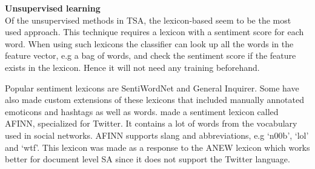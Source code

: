\noindent
\textbf{Unsupervised learning} \\
\noindent Of the unsupervised methods in TSA, the lexicon-based seem to be the most used approach. This technique requires a lexicon with a sentiment score for each word. When using such lexicons the classifier can look up all the words in the feature vector, e.g a bag of words, and check the sentiment score if the feature exists in the lexicon. Hence it will not need any training beforehand.
	
Popular sentiment lexicons are SentiWordNet and General Inquirer. Some have also made custom extensions of these lexicons that included manually annotated emoticons and hashtags as well as words. \cite{article:afinn} made a sentiment lexicon called AFINN, specialized for Twitter. It contains a lot of words from the vocabulary used in social networks. AFINN supports slang and abbreviations, e.g ‘n00b’, ‘lol’ and ‘wtf’. This lexicon was made as a response to the ANEW lexicon which works better for document level SA since it does not support the Twitter language.